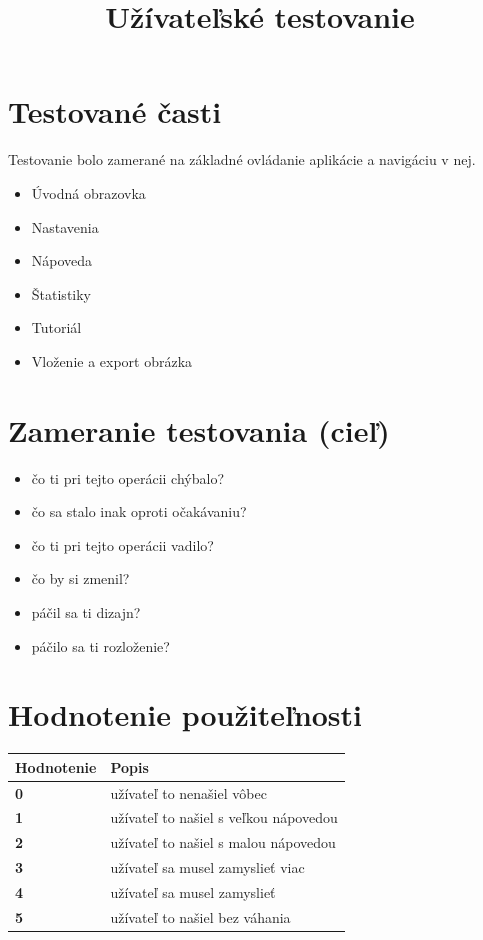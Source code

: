 \documentclass[a4paper,12pt]{article}
\title{Užívateľské testovanie}
\date{}
\begin{document}
\maketitle

\section*{Testované časti}
Testovanie bolo zamerané na základné ovládanie aplikácie a navigáciu v nej.
\begin{itemize}
    \item Úvodná obrazovka
    \item Nastavenia
    \item Nápoveda
    \item Štatistiky
    \item Tutoriál
    \item Vloženie a export obrázka
\end{itemize}

\section*{Zameranie testovania (cieľ)}
\begin{itemize}
    \item čo ti pri tejto operácii chýbalo?
    \item čo sa stalo inak oproti očakávaniu?
    \item čo ti pri tejto operácii vadilo?
    \item čo by si zmenil?
    \item páčil sa ti dizajn?
    \item páčilo sa ti rozloženie?
\end{itemize}

\newpage
\section*{Hodnotenie použiteľnosti}
\begin{longtable}{>{\bfseries}l l}
\toprule
Hodnotenie & Popis \\
\midrule
0 & užívateľ to nenašiel vôbec \\
1 & užívateľ to našiel s veľkou nápovedou \\
2 & užívateľ to našiel s malou nápovedou \\
3 & užívateľ sa musel zamyslieť viac \\
4 & užívateľ sa musel zamyslieť \\
5 & užívateľ to našiel bez váhania \\
\bottomrule
\end{longtable}
\end{document}
